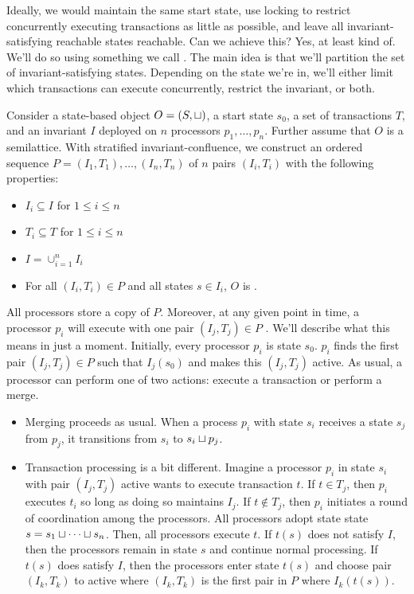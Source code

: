 Ideally, we would maintain the same start state, use locking to restrict
concurrently executing transactions as little as possible, and leave all
invariant-satisfying reachable states reachable. Can we achieve this?  Yes, at
least kind of. We'll do so using something we call . The main idea is that we'll partition the set of
invariant-satisfying states. Depending on the state we're in, we'll either
limit which transactions can execute concurrently, restrict the invariant, or
both.

Consider a state-based object $O = (S, \sqcup)$, a start state $s_0$, a set of
transactions $T$, and an invariant $I$ deployed on $n$ processors $p_1, \ldots,
p_n$. Further assume that $O$ is a semilattice.
%
With stratified invariant-confluence, we construct an ordered sequence $P =
(I_1, T_1), \ldots, (I_n, T_n)$ of $n$ pairs $(I_i, T_i)$ with the following
properties:
\begin{itemize}
  \item
    $I_i \subseteq I$ for $1 \leq i \leq n$

  \item
    $T_i \subseteq T$ for $1 \leq i \leq n$

  \item
    $I = \cup_{i=1}^n I_i$

  \item
    For all $(I_i, T_i) \in P$ and all states $s \in I_i$, $O$ is
    .
\end{itemize}
All processors store a copy of $P$. Moreover, at any given point in time, a
processor $p_i$ will execute with one pair $(I_j, T_j) \in P$ .
We'll describe what this means in just a moment. Initially, every processor
$p_i$ is state $s_0$. $p_i$ finds the first pair $(I_j, T_j) \in P$ such that
$I_j(s_0)$ and makes this $(I_j, T_j)$ active. As usual, a processor can
perform one of two actions: execute a transaction or perform a merge.
\begin{itemize}
  \item
    Merging proceeds as usual. When a process $p_i$ with state $s_i$ receives a
    state $s_j$ from $p_j$, it transitions from $s_i$ to $s_i \sqcup p_j$.

  \item
    Transaction processing is a bit different. Imagine a processor $p_i$ in
    state $s_i$ with pair $(I_j, T_j)$ active wants to execute transaction $t$.
    If $t \in T_j$, then $p_i$ executes $t_i$ so long as doing so maintains
    $I_j$.
    If $t \notin T_j$, then $p_i$ initiates a round of coordination among the
    processors. All processors adopt state state $s = s_1 \sqcup \cdots \sqcup
    s_n$. Then, all processors execute $t$. If $t(s)$ does not satisfy $I$,
    then the processors remain in state $s$ and continue normal processing.  If
    $t(s)$ does satisfy $I$, then the processors enter state $t(s)$ and choose
    pair $(I_k, T_k)$ to active where $(I_k, T_k)$ is the first pair in $P$
    where $I_k(t(s))$.
\end{itemize}

